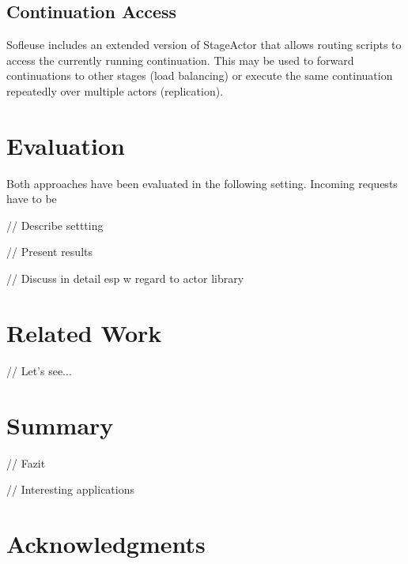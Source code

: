 \documentclass{sig-alternate}
\begin{document}
\subsection{Continuation Access}

Sofleuse includes an extended version of StageActor that allows routing scripts to 
access the currently running continuation.  This may be used to forward continuations
to other stages (load balancing) or execute the same continuation repeatedly over multiple
actors (replication).                               


\section{Evaluation}
               
Both approaches have been evaluated in the following setting. Incoming requests have to be

// Describe settting

// Present results

// Discuss in detail esp w regard to actor library


\section{Related Work}

// Let's see...

\section{Summary}
                  
// Fazit

// Interesting applications

\section{Acknowledgments}


%  
\end{document}
